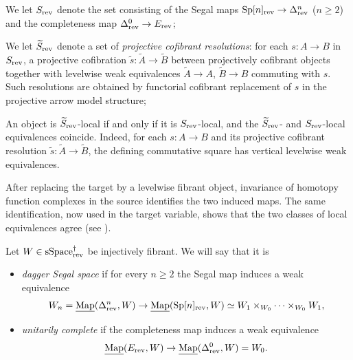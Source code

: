 \documentclass[a4paper,dvipdfmx,11pt]{amsart}
\begin{document}
\begin{notation}\label{h1.not.S}
  We let $S_{\mathrm{rev}}$ denote the set consisting of the Segal maps $\mathrm{Sp}[n]_{\mathrm{rev}}\to\Delta^n_{\mathrm{rev}}$ ($n\geq2$) and the completeness map $\Delta^0_{\mathrm{rev}}\to E_{\mathrm{rev}}$;
  
  We let $\widetilde S_{\mathrm{rev}}$ denote a set of \emph{projective cofibrant resolutions}: 
  for each $s:A\to B$ in $S_{\mathrm{rev}}$, a projective cofibration $\widetilde s:\widetilde A\to\widetilde B$ between projectively cofibrant objects together with levelwise weak equivalences $\widetilde A\to A$, $\widetilde B\to B$ commuting with $s$.
  Such resolutions are obtained by functorial cofibrant replacement of $s$ in the projective arrow model structure;
\end{notation}

\begin{remark}\label{h1.rem.S-comparison}
  An object is $\widetilde S_{\mathrm{rev}}$-local if and only if it is $S_{\mathrm{rev}}$-local, and the $\widetilde S_{\mathrm{rev}}$- and $S_{\mathrm{rev}}$-local equivalences coincide.  
  Indeed, for each $s:A\to B$ and its projective cofibrant resolution $\widetilde s:\widetilde A\to\widetilde B$, the defining commutative square has vertical levelwise weak equivalences.  
  
  After replacing the target by a levelwise fibrant object, invariance of homotopy function complexes in the source identifies the two induced maps.  
  The same identification, now used in the target variable, shows that the two classes of local equivalences agree (see \cite[\S17.4]{Hir02}).
\end{remark}

\begin{definition}\label{h1.def.segal-complete}
  Let $W\in\mathrm{sSpace}^{\dag}_{\mathrm{rev}}$ be injectively fibrant.
  We will say that it is 
  \begin{itemize}
    \item \emph{dagger Segal space} if for every $n\geq2$ the Segal map induces a weak equivalence
    \begin{align}
      W_n
      =
      \underline{\operatorname{Map}}(\Delta^n_{\mathrm{rev}},W)
      \to
      \underline{\operatorname{Map}}(\mathrm{Sp}[n]_{\mathrm{rev}},W)
      \simeq
      W_1\times_{W_0}\cdots\times_{W_0}W_1,
    \end{align}
    \item \emph{unitarily complete} if the completeness map induces a weak equivalence
    \begin{align}
      \underline{\operatorname{Map}}(E_{\mathrm{rev}},W)\to\underline{\operatorname{Map}}(\Delta^0_{\mathrm{rev}},W)=W_0 .
    \end{align}
  \end{itemize}
\end{definition}
\end{document}
